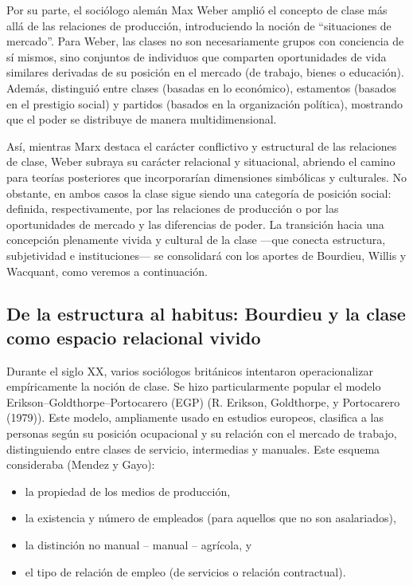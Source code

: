 \documentclass[
  spanish,
  letterpaper,
  DIV=11,
  numbers=noendperiod]{scrreprt}
\begin{document}
Por su parte, el sociólogo alemán Max Weber amplió el concepto de clase
más allá de las relaciones de producción, introduciendo la noción de
``situaciones de mercado''. Para Weber, las clases no son necesariamente
grupos con conciencia de sí mismos, sino conjuntos de individuos que
comparten oportunidades de vida similares derivadas de su posición en el
mercado (de trabajo, bienes o educación). Además, distinguió entre
clases (basadas en lo económico), estamentos (basados en el prestigio
social) y partidos (basados en la organización política), mostrando que
el poder se distribuye de manera multidimensional.

Así, mientras Marx destaca el carácter conflictivo y estructural de las
relaciones de clase, Weber subraya su carácter relacional y situacional,
abriendo el camino para teorías posteriores que incorporarían
dimensiones simbólicas y culturales. No obstante, en ambos casos la
clase sigue siendo una categoría de posición social: definida,
respectivamente, por las relaciones de producción o por las
oportunidades de mercado y las diferencias de poder. La transición hacia
una concepción plenamente vivida y cultural de la clase ---que conecta
estructura, subjetividad e instituciones--- se consolidará con los
aportes de Bourdieu, Willis y Wacquant, como veremos a continuación.

\subsection{De la estructura al habitus: Bourdieu y la clase como
espacio relacional
vivido}\label{de-la-estructura-al-habitus-bourdieu-y-la-clase-como-espacio-relacional-vivido}

Durante el siglo XX, varios sociólogos británicos intentaron
operacionalizar empíricamente la noción de clase. Se hizo
particularmente popular el modelo Erikson--Goldthorpe--Portocarero (EGP)
(R. Erikson, Goldthorpe, y Portocarero (1979)). Este modelo, ampliamente
usado en estudios europeos, clasifica a las personas según su posición
ocupacional y su relación con el mercado de trabajo, distinguiendo entre
clases de servicio, intermedias y manuales. Este esquema consideraba
(Mendez y Gayo):

\begin{itemize}
\item
  la propiedad de los medios de producción,
\item
  la existencia y número de empleados (para aquellos que no son
  asalariados),
\item
  la distinción no manual -- manual -- agrícola, y
\item
  el tipo de relación de empleo (de servicios o relación contractual).
\end{itemize}
\end{document}
